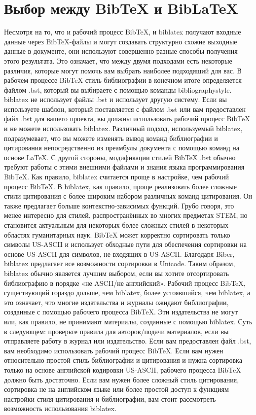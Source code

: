 \documentclass{article}
\begin{document}
  \section{Выбор между BibTeX и BibLaTeX}
  \label{sec:rules}
  

  Несмотря на то, что и рабочий процесс BibTeX, и biblatex получают входные данные через BibTeX-файлы и могут создавать структурно схожие выходные данные в документе, они используют совершенно разные способы получения этого результата. Это означает, что между двумя подходами есть некоторые различия, которые могут помочь вам выбрать наиболее подходящий для вас.
В рабочем процессе BibTeX стиль библиографии в конечном итоге определяется файлом .bst,
который вы выбираете с помощью команды bibliographystyle. biblatex не
использует файлы .bst и использует другую систему. Если вы используете шаблон, который поставляется с файлом .bst или вам предоставлен файл .bst для вашего проекта, вы должны использовать рабочий процесс BibTeX и не можете использовать biblatex.
Различный подход, используемый biblatex, подразумевает, что вы можете изменять вывод команд библиографии и цитирования непосредственно из преамбулы документа с помощью команд на основе LaTeX. С другой стороны, модификации стилей BibTeX .bst
обычно требуют работы с этими внешними файлами и знания
языка программирования BibTeX. Как правило, biblatex считается
проще в настройке, чем рабочий процесс BibTeX.
В biblatex, как правило, проще реализовать более сложные стили цитирования с
более широким набором различных команд цитирования. Он также предлагает больше контекстно-зависимых
функций. Грубо говоря, это менее интересно для стилей, распространённых во многих
предметах STEM, но становится актуальным для некоторых более сложных стилей в некоторых областях
гуманитарных наук.
BibTeX может корректно сортировать только символы US-ASCII и использует обходные пути для
обеспечения сортировки на основе US-ASCII для символов, не входящих в US-ASCII. Благодаря Biber, biblatex предлагает все возможности сортировки в Unicode. Таким образом, biblatex обычно является лучшим
выбором, если вы хотите отсортировать библиографию в порядке «не ASCII/не английский». Рабочий процесс BibTeX, существующий гораздо дольше, чем biblatex, более
устоявшийся, чем biblatex, а это означает, что многие издательства и журналы ожидают
библиографии, созданные с помощью рабочего процесса BibTeX. Эти издательства не могут или, как правило, не принимают материалы, созданные с помощью biblatex.
Суть в следующем: проверьте правила для авторов/подачи материалов, если вы отправляете
работу в журнал или издательство. Если вам предоставлен файл .bst, вам необходимо использовать рабочий процесс BibTeX. Если вам нужен относительно простой стиль библиографии и цитирования и
нужна сортировка только на основе английской кодировки US-ASCII, рабочего процесса BibTeX должно быть достаточно. Если вам
нужен более сложный стиль цитирования, сортировка не на английском языке или более простой доступ к
функциям настройки стиля цитирования и библиографии, вам стоит рассмотреть возможность использования biblatex.
\end{document}
